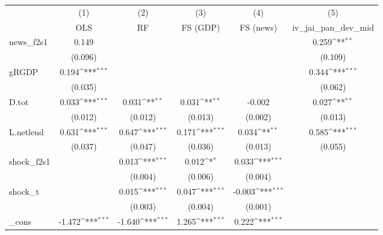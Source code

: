 {
\def\sym#1{\ifmmode^{#1}\else\(^{#1}\)\fi}
\begin{tabular}{l*{5}{c}}
\toprule
            &\multicolumn{1}{c}{(1)}&\multicolumn{1}{c}{(2)}&\multicolumn{1}{c}{(3)}&\multicolumn{1}{c}{(4)}&\multicolumn{1}{c}{(5)}\\
            &\multicolumn{1}{c}{OLS}&\multicolumn{1}{c}{RF}&\multicolumn{1}{c}{FS (GDP)}&\multicolumn{1}{c}{FS (news)}&\multicolumn{1}{c}{iv\_jai\_pan\_dev\_mid}\\
\midrule
news\_f2s1   &       0.149         &                     &                     &                     &       0.259\sym{**} \\
            &     (0.096)         &                     &                     &                     &     (0.109)         \\
\addlinespace
gRGDP       &       0.194\sym{***}&                     &                     &                     &       0.344\sym{***}\\
            &     (0.035)         &                     &                     &                     &     (0.062)         \\
\addlinespace
D.tot       &       0.033\sym{***}&       0.031\sym{**} &       0.031\sym{**} &      -0.002         &       0.027\sym{**} \\
            &     (0.012)         &     (0.012)         &     (0.013)         &     (0.002)         &     (0.013)         \\
\addlinespace
L.netlend   &       0.631\sym{***}&       0.647\sym{***}&       0.171\sym{***}&       0.034\sym{**} &       0.585\sym{***}\\
            &     (0.037)         &     (0.047)         &     (0.036)         &     (0.013)         &     (0.055)         \\
\addlinespace
shock\_f2s1  &                     &       0.013\sym{***}&       0.012\sym{*}  &       0.033\sym{***}&                     \\
            &                     &     (0.004)         &     (0.006)         &     (0.004)         &                     \\
\addlinespace
shock\_t     &                     &       0.015\sym{***}&       0.047\sym{***}&      -0.003\sym{***}&                     \\
            &                     &     (0.003)         &     (0.004)         &     (0.001)         &                     \\
\addlinespace
\_cons      &      -1.472\sym{***}&      -1.640\sym{***}&       1.265\sym{***}&       0.222\sym{***}&                     \\

\end{tabular}}
